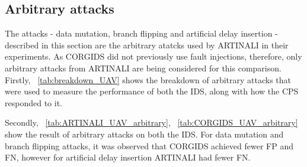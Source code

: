 \subsection{Arbitrary attacks}
The attacks - data mutation, branch flipping and artificial delay insertion - described in this section are the arbitrary atatcks used by ARTINALI in their experiments. As CORGIDS did not previously use fault injections, therefore, only arbitrary attacks from ARTINALI are being considered for this comparison.
Firstly, ~\autoref{tab:breakdown_UAV} shows the breakdown of arbitrary attacks that were used to measure the performance of both the IDS, along with how the CPS responded to it.

\begin{table}
\centering
  \caption{Breakdown of arbitrary attacks for UAV platform}
  \label{tab:breakdown_UAV}
\end{table}

Secondly, ~\autoref{tab:ARTINALI_UAV_arbitrary}, ~\autoref{tab:CORGIDS_UAV_arbitrary} show the result of arbitrary attacks on both the IDS. For data mutation and branch flipping attacks, it was observed that CORGIDS achieved fewer FP and FN, however for artificial delay insertion ARTINALI had fewer FN.

\begin{table}
\centering
  \caption{Results of intrusion detection by ARTINALI for arbitrary attacks on UAV platform}
  \label{tab:ARTINALI_UAV_arbitrary}
\end{table}

